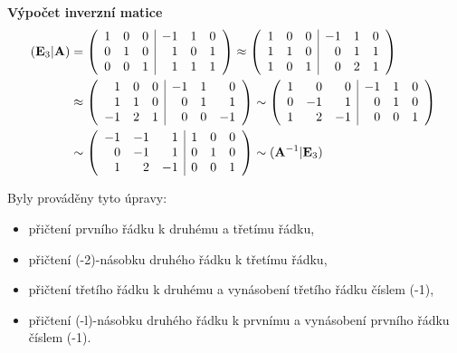 \begin{mdframed}[style=mdexam]
  \begin{example}\label{MAI:exam090}
    \textbf{Výpočet inverzní matice}
    \begin{gather*}
      \begin{aligned}
        (\mathbf{E}_3\lvert\mathbf{A}) &=
        \left(
        \begin{array}{rrr|rrr}
          1 & 0 & 0 & -1 & 1 & 0 \\
          0 & 1 & 0 &  1 & 0 & 1 \\
          0 & 0 & 1 &  1 & 1 & 1 
        \end{array}
        \right) \approx
        \left(
        \begin{array}{rrr|rrr}
          1 & 0 & 0 & -1 & 1 & 0 \\
          1 & 1 & 0 &  0 & 1 & 1 \\
          1 & 0 & 1 &  0 & 2 & 1 
        \end{array}
        \right)         \\
        &\approx    
        \left(
        \begin{array}{rrr|rrr}
          1 & 0 & 0 & -1 & 1 &  0 \\
          1 & 1 & 0 &  0 & 1 &  1 \\
          -1 & 2 & 1 &  0 & 0 & -1 
        \end{array}
        \right) \sim   
        \left(
        \begin{array}{rrr|rrr}
          1 &  0 &  0 & -1 & 1 &  0 \\
          0 & -1 &  1 &  0 & 1 &  0 \\
          1 &  2 & -1 &  0 & 0 &  1 
        \end{array}   
        \right)~    \\
        &\sim
        \left(
        \begin{array}{rrr|rrr}
          -1 & -1 &  1 &  1 & 0 &  0 \\
           0 & -1 &  1 &  0 & 1 &  0 \\
           1 &  2 & -1 &  0 & 0 &  1 
        \end{array}
        \right) \sim (\mathbf{A}^{-1}\lvert\mathbf{E}_3)   
      \end{aligned}  
    \end{gather*}

    Byly prováděny tyto úpravy:
    \begin{itemize}[noitemsep]
      \item přičtení prvního řádku k druhému a třetímu řádku,
      \item přičtení (-2)-násobku druhého řádku k třetímu řádku,
      \item přičtení třetího řádku k druhému a vynásobení třetího řádku číslem (-1),
      \item přičtení (-l)-násobku druhého řádku k prvnímu a vynásobení prvního řádku číslem (-1).
    \end{itemize}
  \end{example}
\end{mdframed}